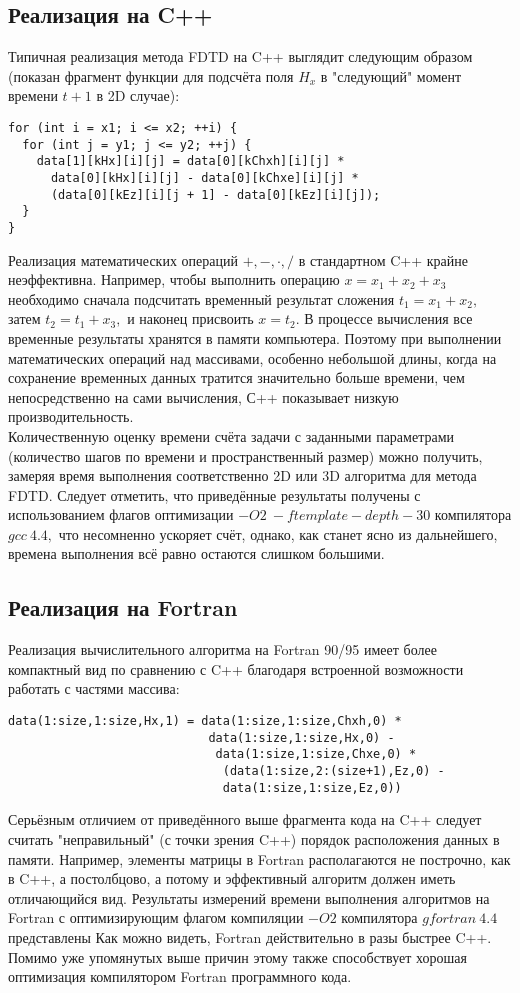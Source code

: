 \documentclass[10pt]{article}
\begin{document}
\subsection{Реализация на C++}
Типичная реализация метода FDTD на C++ выглядит следующим образом
(показан фрагмент функции для подсчёта поля $H_x$ в "следующий"
момент времени $t+1$ в 2D случае):\\
\begin{verbatim}
for (int i = x1; i <= x2; ++i) {
  for (int j = y1; j <= y2; ++j) {
    data[1][kHx][i][j] = data[0][kChxh][i][j] *
      data[0][kHx][i][j] - data[0][kChxe][i][j] *
      (data[0][kEz][i][j + 1] - data[0][kEz][i][j]);
  }
}
\end{verbatim}
Реализация математических операций $+,-,\cdot,/$ в стандартном C++ крайне
неэффективна. Например, чтобы выполнить операцию $x=x_1+x_2+x_3$ необходимо
сначала подсчитать временный результат сложения $t_1=x_1+x_2,$ затем 
$t_2=t_1+x_3,$ и наконец присвоить $x=t_2$. В процессе вычисления все временные
результаты хранятся в памяти компьютера. Поэтому при выполнении математических
операций над массивами, особенно небольшой длины, когда на сохранение временных
данных тратится значительно больше времени, чем непосредственно на сами 
вычисления, С++ показывает низкую производительность.\\
Количественную оценку времени счёта задачи с заданными параметрами
(количество шагов по времени и пространственный размер) можно получить,
замеряя время выполнения соответственно 2D или 3D алгоритма для метода FDTD.
Следует отметить, что приведённые результаты получены с использованием флагов
оптимизации $-O2~-ftemplate-depth-30$ компилятора $gcc~4.4,$ что несомненно 
ускоряет счёт, однако, как станет ясно из дальнейшего, времена выполнения 
всё равно остаются слишком большими.
\subsection{Реализация на Fortran}
Реализация вычислительного алгоритма на Fortran 90/95 имеет более компактный
вид по сравнению с C++ благодаря встроенной возможности работать с частями
массива:\\
\begin{verbatim}
data(1:size,1:size,Hx,1) = data(1:size,1:size,Chxh,0) * 
                            data(1:size,1:size,Hx,0) -
                             data(1:size,1:size,Chxe,0) *
                              (data(1:size,2:(size+1),Ez,0) -
                              data(1:size,1:size,Ez,0))
\end{verbatim}
Серьёзным отличием от приведённого выше фрагмента кода на C++ следует считать 
"неправильный" (с точки зрения C++) порядок расположения данных в памяти.
Например, элементы матрицы в Fortran располагаются не построчно, как в C++,
а постолбцово, а потому и эффективный алгоритм должен иметь отличающийся вид.
Результаты измерений времени выполнения алгоритмов на Fortran
с оптимизирующим флагом компиляции $-O2$ компилятора $gfortran~4.4$ представлены
Как можно видеть, Fortran действительно в разы быстрее C++.
Помимо уже упомянутых выше причин этому также способствует хорошая
оптимизация компилятором Fortran программного кода.
\end{document}
